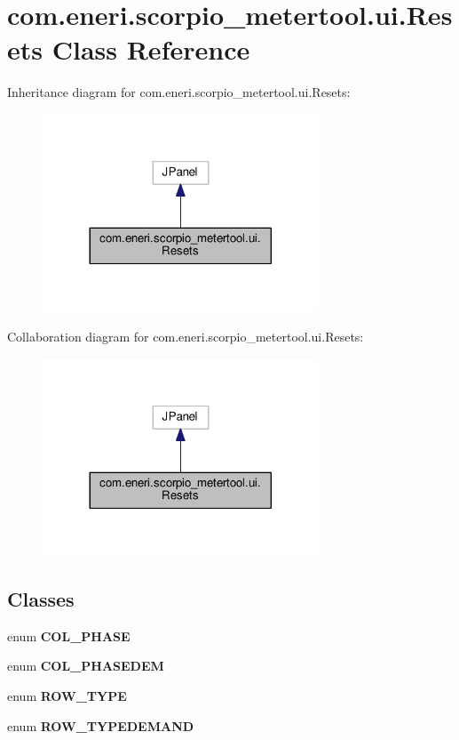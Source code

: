 \hypertarget{classcom_1_1eneri_1_1scorpio__metertool_1_1ui_1_1_resets}{}\section{com.\+eneri.\+scorpio\+\_\+metertool.\+ui.\+Resets Class Reference}
\label{classcom_1_1eneri_1_1scorpio__metertool_1_1ui_1_1_resets}


Inheritance diagram for com.\+eneri.\+scorpio\+\_\+metertool.\+ui.\+Resets\+:
\nopagebreak
\begin{figure}[H]
\begin{center}
\leavevmode
\includegraphics[width=233pt]{classcom_1_1eneri_1_1scorpio__metertool_1_1ui_1_1_resets__inherit__graph}
\end{center}
\end{figure}


Collaboration diagram for com.\+eneri.\+scorpio\+\_\+metertool.\+ui.\+Resets\+:
\nopagebreak
\begin{figure}[H]
\begin{center}
\leavevmode
\includegraphics[width=233pt]{classcom_1_1eneri_1_1scorpio__metertool_1_1ui_1_1_resets__coll__graph}
\end{center}
\end{figure}
\subsection*{Classes}
\begin{DoxyCompactItemize}
\item 
enum {\bfseries C\+O\+L\+\_\+\+P\+H\+A\+SE}
\item 
enum {\bfseries C\+O\+L\+\_\+\+P\+H\+A\+S\+E\+D\+EM}
\item 
enum {\bfseries R\+O\+W\+\_\+\+T\+Y\+PE}
\item 
enum {\bfseries R\+O\+W\+\_\+\+T\+Y\+P\+E\+D\+E\+M\+A\+ND}
\end{DoxyCompactItemize}
